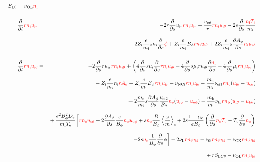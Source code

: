 \documentclass[11pt]{article}
\def\r#1{{\rm#1}}
\def\ddt{\frac{\partial}{\partial t}}
\def\dds{\frac{\partial}{\partial s}}
\def\dd#1{\frac{\partial #1}{\partial s}}
\def\ave#1{\left\langle#1\right\rangle}
\def\me{m_\r{e}}
\def\mi{m_\r{i}}
\def\mb{m_\r{b}}
\def\mui{\mu_\r{i}}
\def\De{D_\r{e}}
\def\Di{D_\r{i}}
\def\nee{n_\r{e}}
\def\ni{n_\r{i}}
\def\nb{n_\r{b}}
\def\uir{u_{\r{i}r}}
\def\ueth{u_{\r{e}\theta}}
\def\uith{u_{\r{i}\theta}}
\def\ubth{u_{\r{b}\theta}}
\def\ueph{u_{\r{e}\phi}}
\def\uiph{u_{\r{i}\phi}}
\def\Bth{B_\theta}
\def\Bph{B_\phi}
\def\Athd{\dot{A}_\theta}
\def\Aph{A_\phi}
\def\Te{T_\r{e}}
\def\Ti{T_\r{i}}
\def\Zi{Z_\r{i}}
\def\nuNCi{\nu_\r{NCi}}
\def\nubi{\nu_\r{bi}}
\def\nuni{\nu_\r{0i}}
\def\nuL{\nu_\r{L}}
\def\nuCX{\nu_\r{CX}}
\def\nuOL{\nu_\r{OL}}
\def\red#1{\textcolor{red}{#1}}
\begin{document}
\begin{eqnarray}
%
  + S_\r{LC}
%
  - \nuOL \red{\ni}
\\[5mm]
  \ddt \red{r \ni \uir} &=&
%
  - 2 r \dds \uir \red{r \ni \uir}
%
  + \frac{\ueth}{r} \red{r \ni \uith}
%
  - 2 s \dds \frac{\red{\ni \Ti}}{\mi}
\nonumber\\[3mm]&&{}
%
  - 2 \Zi \frac{e}{\mi} s \ni \dds \red{\phi}
%
  + \Zi \frac{e}{\mi} \Bph \red{r \ni \uith}
%
  + 2 \Zi \frac{e}{\mi} s \dd{\Aph} \red{\ni \uiph}
\\[5mm]
  \ddt \red{r \ni \uith} &=&
%
  - 2 \dds r \uir \red{r \ni \uith}
%
  + \left(   4 \dds s \mui \dds \red{r \ni \uith}
%
           - 4 \dds s \mui r \uith \dd{\red{\ni}}
%
	   - 4 \dds \mui \red{r \ni \uith} \right)
\nonumber\\[2.5mm]&&{}
%
- \Zi \frac{e}{\mi} \ni \red{r \Athd}
%
  - \Zi \frac{e}{\mi} \Bph \red{r \ni \uir}
%
  - \nuNCi \red{r \ni \uith}
%
  - \frac{\me}{\mi} \nu_\r{ei1} \red{r \nee} (\red{\uith} - \red{\ueth})
\nonumber\\[2.5mm]&&{}
%
  + 2 \frac{\me}{\mi} s \dd{\Aph} \frac{\nu_\r{ei2}}{\Bth} \red{\nee} (\red{\uiph} - \red{\ueph})
%
  - \frac{\mb}{\mi} \nubi \red{r \nb} (\red{\uith} - \red{\ubth})
\nonumber\\[2.5mm]&&{}
%
%
  + \frac{e^2 \Bph^2 \De}{\mi\Te}\left[
    \red{r\nee\ueth} + 2\dd{\Aph}\frac{s}{\Bph}\red{\nee\ueph}
     + s \red{\nee}\frac{B}{\Bph}\ave{\frac{\omega}{m}}_\r{e}
     + 2 s \frac{1-\alpha_\r{e}}{e\Bph} \left(\dds \red{\nee\Te} -
					      \Te \dds \red{\nee}\right)\right.
\nonumber\\[2.5mm]&&{}
%
     \left.- 2 s \red{\nee}\frac{1}{\Bph} \dds \phi \right]
%
%
  - 2 \nuL \red{r \ni \uith}
%
  - \nuni \red{r \ni \uith}
%
  - \nuCX \red{r \ni \uith}
\nonumber\\[2.5mm]&&{}
%
  + r S_\r{LC\theta}
%
  - \nuOL \red{r \ni \uith}
%

\end{eqnarray}
\end{document}
